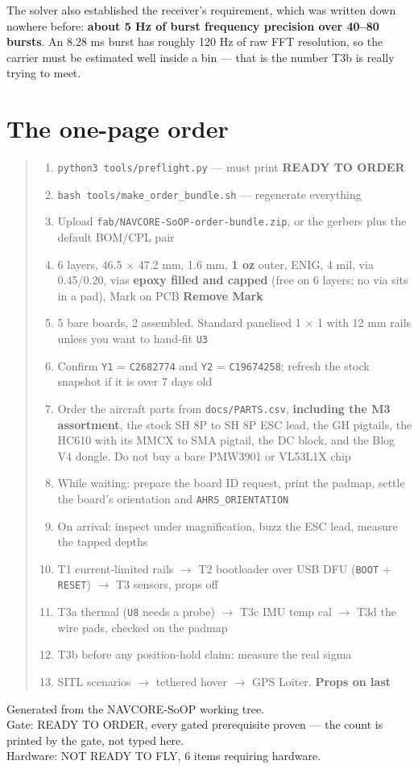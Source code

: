 \documentclass[11pt,a4paper]{article}
\newcommand{\file}[1]{\texttt{\small #1}}
\newcommand{\cmd}[1]{\texttt{\small #1}}
\newcommand{\good}[1]{\textcolor{okgreen}{\textbf{#1}}}
\begin{document}
The solver also established the receiver's requirement, which was written down nowhere before:
\textbf{about 5 Hz of burst frequency precision over 40--80 bursts}. An 8.28 ms burst has
roughly 120 Hz of raw FFT resolution, so the carrier must be estimated well inside a bin ---
that is the number T3b is really trying to meet.

\section*{The one-page order}

\begin{quote}\small
\begin{enumerate}[label=\arabic*.,leftmargin=1.4em]
\item \cmd{python3 tools/preflight.py} --- must print \good{READY TO ORDER}
\item \cmd{bash tools/make\_order\_bundle.sh} --- regenerate everything
\item Upload \file{fab/NAVCORE-SoOP-order-bundle.zip}, or the gerbers plus the default
BOM/CPL pair
\item 6 layers, 46.5 $\times$ 47.2 mm, 1.6 mm, \textbf{1 oz} outer, ENIG, 4 mil, via
0.45/0.20, vias \textbf{epoxy filled and capped} (free on 6 layers; no via sits in a pad), Mark on PCB \textbf{Remove Mark}
\item 5 bare boards, 2 assembled. Standard panelised 1 $\times$ 1 with 12 mm rails unless you want to
hand-fit \file{U3}
\item Confirm \file{Y1} = \file{C2682774} and \file{Y2} = \file{C19674258}; refresh the stock
snapshot if it is over 7 days old
\item Order the aircraft parts from \file{docs/PARTS.csv}, \textbf{including the M3
assortment}, the stock SH 8P to SH 8P ESC lead, the GH pigtails, the HC610 with its MMCX to
SMA pigtail, the DC block, and the Blog V4 dongle.
Do not buy a bare PMW3901 or VL53L1X chip
\item While waiting: prepare the board ID request, print the padmap, settle the board's
orientation and \file{AHRS\_ORIENTATION}
\item On arrival: inspect under magnification, buzz the ESC lead, measure the tapped depths
\item T1 current-limited rails $\rightarrow$ T2 bootloader over USB DFU (\file{BOOT} +
\file{RESET}) $\rightarrow$ T3 sensors, props off
\item T3a thermal (\file{U8} needs a probe) $\rightarrow$ T3c IMU temp cal $\rightarrow$ T3d
the wire pads, checked on the padmap
\item T3b before any position-hold claim: measure the real sigma
\item SITL scenarios $\rightarrow$ tethered hover $\rightarrow$ GPS Loiter. \textbf{Props on
last}
\end{enumerate}
\end{quote}

\vfill
\begin{center}
\footnotesize\color{sidegrey}
Generated from the NAVCORE-SoOP working tree.\\
Gate: READY TO ORDER, every gated prerequisite proven --- the count is printed by the gate, not typed here.\\
Hardware: NOT READY TO FLY, 6 items requiring hardware.
\end{center}
\end{document}
